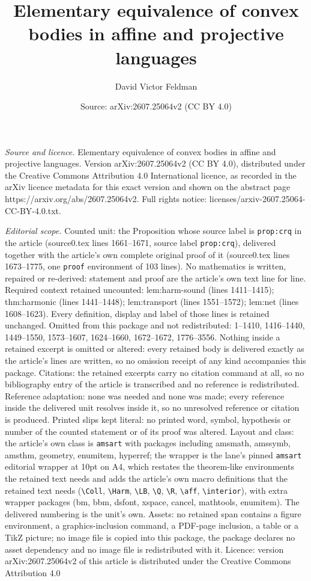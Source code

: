 \documentclass[10pt,a4paper]{amsart}
\title[Elementary equivalence of convex bodies in affine and projec]{Elementary equivalence of convex bodies in affine and projective languages}
\author{David Victor Feldman}
\date{Source: arXiv:2607.25064v2 (CC BY 4.0)}
\begin{document}
\maketitle

\noindent\emph{Source and licence.} Elementary equivalence of convex bodies in affine and projective languages. Version arXiv:2607.25064v2 (CC BY 4.0), distributed under the Creative Commons Attribution 4.0 International licence, as recorded in the arXiv licence metadata for this exact version and shown on the abstract page https://arxiv.org/abs/2607.25064v2. Full rights notice: licenses/arxiv-2607.25064-CC-BY-4.0.txt.\par\smallskip

\noindent\textit{Editorial scope.} Counted unit: the Proposition whose source label is \texttt{prop:crq} in the article (source0.tex lines 1661--1671, source label \texttt{prop:crq}), delivered together with the article's own complete original proof of it (source0.tex lines 1673--1775, one \texttt{proof} environment of 103 lines). No mathematics is written, repaired or re-derived: statement and proof are the article's own text line for line. Required context retained uncounted: lem:harm-sound (lines 1411--1415); thm:harmonic (lines 1441--1448); lem:transport (lines 1551--1572); lem:net (lines 1608--1623). Every definition, display and label of those lines is retained unchanged. Omitted from this package and not redistributed: 1--1410, 1416--1440, 1449--1550, 1573--1607, 1624--1660, 1672--1672, 1776--3556. Nothing inside a retained excerpt is omitted or altered: every retained body is delivered exactly as the article's lines are written, so no omission receipt of any kind accompanies this package. Citations: the retained excerpts carry no citation command at all, so no bibliography entry of the article is transcribed and no reference is redistributed. Reference adaptation: none was needed and none was made; every reference inside the delivered unit resolves inside it, so no unresolved reference or citation is produced. Printed slips kept literal: no printed word, symbol, hypothesis or number of the counted statement or of its proof was altered. Layout and class: the article's own class is \texttt{amsart} with packages including amsmath, amssymb, amsthm, geometry, enumitem, hyperref; the wrapper is the lane's pinned \texttt{amsart} editorial wrapper at 10pt on A4, which restates the theorem-like environments the retained text needs and adds the article's own macro definitions that the retained text needs (\texttt{\textbackslash Coll}, \texttt{\textbackslash Harm}, \texttt{\textbackslash LB}, \texttt{\textbackslash Q}, \texttt{\textbackslash R}, \texttt{\textbackslash aff}, \texttt{\textbackslash interior}), with extra wrapper packages (bm, bbm, dsfont, xspace, cancel, mathtools, enumitem). The delivered numbering is the unit's own. Assets: no retained span contains a figure environment, a graphics-inclusion command, a PDF-page inclusion, a table or a TikZ picture; no image file is copied into this package, the package declares no asset dependency and no image file is redistributed with it. Licence: version arXiv:2607.25064v2 of this article is distributed under the Creative Commons Attribution 4.0 
\end{document}
